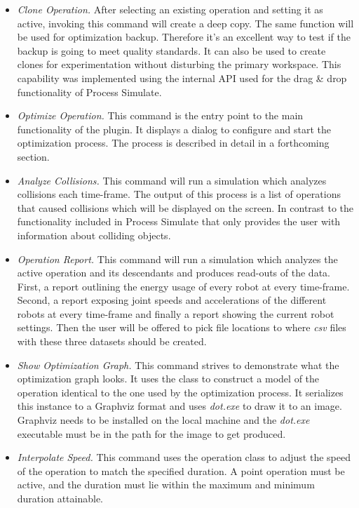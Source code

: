 \begin{itemize}
    \item \emph{Clone Operation.} After selecting an existing operation and setting it as active, invoking this command will create a deep copy. The same function will be used for optimization backup. Therefore it's an excellent way to test if the backup is going to meet quality standards. It can also be used to create clones for experimentation without disturbing the primary workspace. This capability was implemented using the internal API used for the drag \& drop functionality of Process Simulate.
    
    \item \emph{Optimize Operation.} This command is the entry point to the main functionality of the plugin. It displays a dialog to configure and start the optimization process. The process is described in detail in a forthcoming section. 
    
    \item \emph{Analyze Collisions.} This command will run a simulation which analyzes collisions each time-frame. The output of this process is a list of operations that caused collisions which will be displayed on the screen. In contrast to the functionality included in Process Simulate that only provides the user with information about colliding objects.
    
    \item \emph{Operation Report.}  This command will run a simulation which analyzes the active operation and its descendants and produces read-outs of the data. First, a report outlining the energy usage of every robot at every time-frame. Second, a report exposing joint speeds and accelerations of the different robots at every time-frame and finally a report showing the current robot settings. Then the user will be offered to pick file locations to where \emph{csv} files with these three datasets should be created.

    \item \emph{Show Optimization Graph.} This command strives to demonstrate what the optimization graph looks. It uses the  class to construct a model of the operation identical to the one used by the optimization process. It serializes this instance to a Graphviz format and uses \emph{dot.exe} to draw it to an image. Graphviz \cite{Graphviz} needs to be installed on the local machine and the \emph{dot.exe} executable must be in the path for the image to get produced.
    
    \item \emph{Interpolate Speed.} This command uses the operation  class to adjust the speed of the operation to match the specified duration. A point operation must be active, and the duration must lie within the maximum and minimum duration attainable.
        
\end{itemize}

